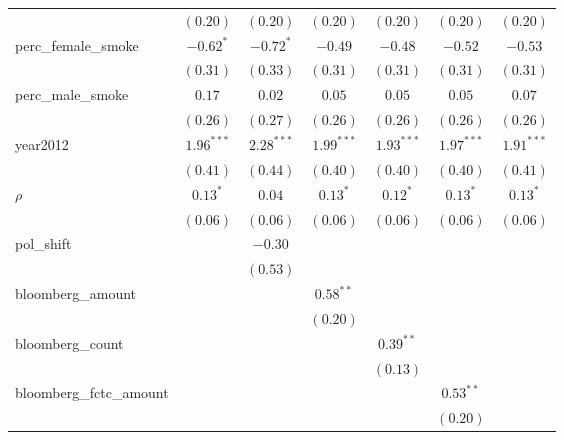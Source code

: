 \begin{table}[!h]
\begin{center}
\begin{tabular}{l c c c c c c }
                        & $(0.20)$     & $(0.20)$     & $(0.20)$     & $(0.20)$     & $(0.20)$     & $(0.20)$     \\
perc\_female\_smoke     & $-0.62^{*}$  & $-0.72^{*}$  & $-0.49$      & $-0.48$      & $-0.52$      & $-0.53$      \\
                        & $(0.31)$     & $(0.33)$     & $(0.31)$     & $(0.31)$     & $(0.31)$     & $(0.31)$     \\
perc\_male\_smoke       & $0.17$       & $0.02$       & $0.05$       & $0.05$       & $0.05$       & $0.07$       \\
                        & $(0.26)$     & $(0.27)$     & $(0.26)$     & $(0.26)$     & $(0.26)$     & $(0.26)$     \\
year2012                & $1.96^{***}$ & $2.28^{***}$ & $1.99^{***}$ & $1.93^{***}$ & $1.97^{***}$ & $1.91^{***}$ \\
                        & $(0.41)$     & $(0.44)$     & $(0.40)$     & $(0.40)$     & $(0.40)$     & $(0.41)$     \\
$\rho$                  & $0.13^{*}$   & $0.04$       & $0.13^{*}$   & $0.12^{*}$   & $0.13^{*}$   & $0.13^{*}$   \\
                        & $(0.06)$     & $(0.06)$     & $(0.06)$     & $(0.06)$     & $(0.06)$     & $(0.06)$     \\
pol\_shift              &              & $-0.30$      &              &              &              &              \\
                        &              & $(0.53)$     &              &              &              &              \\
bloomberg\_amount       &              &              & $0.58^{**}$  &              &              &              \\
                        &              &              & $(0.20)$     &              &              &              \\
bloomberg\_count        &              &              &              & $0.39^{**}$  &              &              \\
                        &              &              &              & $(0.13)$     &              &              \\
bloomberg\_fctc\_amount &              &              &              &              & $0.53^{**}$  &              \\
                        &              &              &              &              & $(0.20)$     &              \\

\end{tabular}
\end{center}
\end{table}
